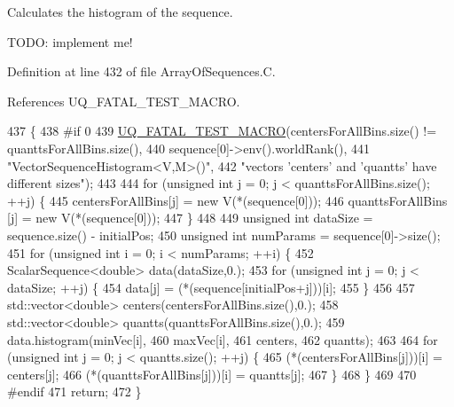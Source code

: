 Calculates the histogram of the sequence. 

T\-O\-D\-O\-: implement me! 

Definition at line 432 of file Array\-Of\-Sequences.\-C.



References U\-Q\-\_\-\-F\-A\-T\-A\-L\-\_\-\-T\-E\-S\-T\-\_\-\-M\-A\-C\-R\-O.


\begin{DoxyCode}
437 \{
438 \textcolor{preprocessor}{#if 0}
439 \textcolor{preprocessor}{}  \hyperlink{_defines_8h_a56d63d18d0a6d45757de47fcc06f574d}{UQ\_FATAL\_TEST\_MACRO}(centersForAllBins.size() != quanttsForAllBins.size(),
440                       sequence[0]->env().worldRank(),
441                       \textcolor{stringliteral}{"VectorSequenceHistogram<V,M>()"},
442                       \textcolor{stringliteral}{"vectors 'centers' and 'quantts' have different sizes"});
443 
444   \textcolor{keywordflow}{for} (\textcolor{keywordtype}{unsigned} \textcolor{keywordtype}{int} j = 0; j < quanttsForAllBins.size(); ++j) \{
445     centersForAllBins[j] = \textcolor{keyword}{new} V(*(sequence[0]));
446     quanttsForAllBins [j] = \textcolor{keyword}{new} V(*(sequence[0]));
447   \}
448 
449   \textcolor{keywordtype}{unsigned} \textcolor{keywordtype}{int} dataSize = sequence.size() - initialPos;
450   \textcolor{keywordtype}{unsigned} \textcolor{keywordtype}{int} numParams = sequence[0]->size();
451   \textcolor{keywordflow}{for} (\textcolor{keywordtype}{unsigned} \textcolor{keywordtype}{int} i = 0; i < numParams; ++i) \{
452     ScalarSequence<double> data(dataSize,0.);
453     \textcolor{keywordflow}{for} (\textcolor{keywordtype}{unsigned} \textcolor{keywordtype}{int} j = 0; j < dataSize; ++j) \{
454       data[j] = (*(sequence[initialPos+j]))[i];
455     \}
456 
457     std::vector<double> centers(centersForAllBins.size(),0.);
458     std::vector<double> quantts(quanttsForAllBins.size(),0.);
459     data.histogram(minVec[i],
460                    maxVec[i],
461                    centers,
462                    quantts);
463 
464     \textcolor{keywordflow}{for} (\textcolor{keywordtype}{unsigned} \textcolor{keywordtype}{int} j = 0; j < quantts.size(); ++j) \{
465       (*(centersForAllBins[j]))[i] = centers[j];
466       (*(quanttsForAllBins[j]))[i] = quantts[j];
467     \}
468   \}
469 
470 \textcolor{preprocessor}{#endif}
471 \textcolor{preprocessor}{}  \textcolor{keywordflow}{return};
472 \}
\end{DoxyCode}
